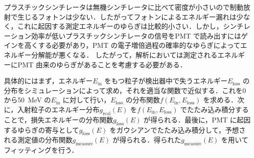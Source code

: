 プラスチックシンチレータは無機シンチレータに比べて密度が小さいので制動放射で生じるフォトンは少ない．したがってフォトンによるエネルギー漏れは少なく，これに起因する測定エネルギーのゆらぎは比較的小さい．しかし，シンチレーション効率が低いプラスチックシンチレータの信号をPMT で読み出すにはゲインを高くする必要があり，PMT の電子増倍過程の確率的なゆらぎによってエネルギー分解能が悪くなる．
したがって，解析においては測定されるエネルギーにPMT 由来のゆらぎがあることを考慮する必要がある．

具体的にはまず，エネルギー$E_\mathrm{in}$ をもつ粒子が検出器中で失うエネルギー$E_\mathrm{loss}$ の分布をシミュレーションによって求め，それを適当な関数で近似する．これを0から50~MeV の$E_\mathrm{in}$ に対して行い，$E_\mathrm{loss}$ の分布関数$f(E_\mathrm{in}, E_\mathrm{loss})$ を求める．次に，入射粒子のエネルギー分布$g_{\mathrm{real}}(E)$ を$f(E_\mathrm{in}, E_\mathrm{loss})$ でたたみ込み積分することで，損失エネルギーの分布関数$g_{\mathrm{loss}}(E)$ が得られる．最後に，PMT に起因するゆらぎの寄与として$g_{\mathrm{loss}}(E)$ をガウシアンでたたみ込み積分して，予想される測定値の分布関数$g_{\mathrm{measure}}(E)$ が得られる．得られた$g_{\mathrm{measure}}(E)$ を用いてフィッティングを行う．
  

